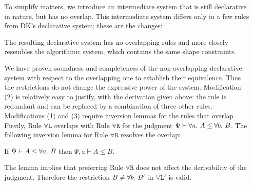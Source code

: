 To simplify matters, we introduce an intermediate system that is still declarative
in nature, but has no overlap. This intermediate system differs only in a few 
rules from DK's declarative system; these are the changes:
The resulting declarative system has no overlapping rules
and more closely resembles the algorithmic system, which contains
the same shape constraints.

We have proven soundness and completeness of the non-overlapping declarative
system with respect to the overlapping one to establish their equivalence.
Thus the restrictions do not change the expressive power of the system.
Modification (2) is relatively easy to justify, with the derivation given above:
the rule is redundant and can be replaced by a combination of three other rules.
Modifications (1) and (3) require inversion lemmas for the rules that overlap.
Firstly, Rule $\mathtt{\forall L}$ overlaps with Rule $\mathtt{\forall R}$ for the judgment
$\Psi \vdash \all A \le \all[b]B$.
The following inversion lemma for Rule $\mathtt{\forall R}$ resolves the overlap:
\begin{lemma}\label{lem:inv_allR}
If $\Psi \vdash A \le \all B$ then $\Psi, a \vdash A \le B$.
\end{lemma}
The lemma implies that preferring Rule $\mathtt{\forall R}$ does not affect the derivability of the judgment.
Therefore the restriction $B \neq \all[b]B'$ in $\mathtt{\forall L'}$ is valid.


